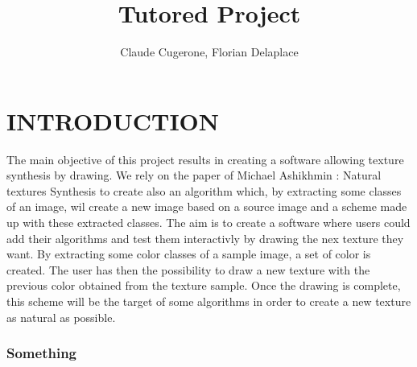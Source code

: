 \documentclass[12pt]{article}
\begin{document}
\title{\huge{Tutored Project}}
\author{Claude Cugerone, Florian Delaplace}
\maketitle
\tableofcontents{}
\newpage
\part{INTRODUCTION}
\medbreak
The main objective of this project results in creating a software allowing texture synthesis by drawing. We rely on the paper of Michael Ashikhmin : Natural textures Synthesis to create also an algorithm which, by extracting some classes of an image, wil create a new image based on a source image and a scheme made up with these extracted classes. The aim is to create a software where users could add their algorithms and test them interactivly by drawing the nex texture they want. By extracting some color classes of a sample image, a set of color is created. The user has then the possibility to draw a new texture with the previous color obtained from the texture sample. Once the drawing is complete, this scheme will be the target of some algorithms in order to create a new texture as natural as possible.
\medbreak
\section{Something}
\medbreak
\end{document}
